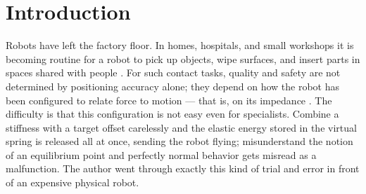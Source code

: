 %

\section{Introduction}\label{sec:u5-intro}

Robots have left the factory floor. In homes, hospitals, and small workshops
it is becoming routine for a robot to pick up objects, wipe surfaces, and
insert parts in spaces shared with people \cite{nvidia_physical_ai_2025}.
For such contact tasks, quality and safety are not determined by positioning
accuracy alone; they depend on how the robot has been configured to relate
force to motion --- that is, on its impedance
\cite{hogan1985impedancepart1,abudakka2020variableimpedance}.
The difficulty is that this configuration is not easy even for specialists.
Combine a stiffness with a target offset carelessly and the elastic energy
stored in the virtual spring is released all at once, sending the robot
flying; misunderstand the notion of an equilibrium point and perfectly normal
behavior gets misread as a malfunction.
The author went through exactly this kind of trial and error in front of an
expensive physical robot.

